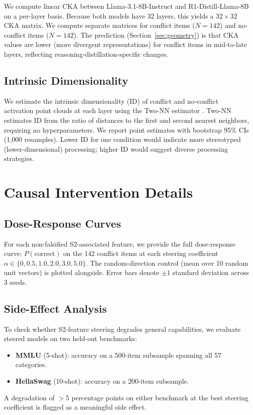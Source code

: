 We compute linear CKA \citep{kornblith2019similarity} between
Llama-3.1-8B-Instruct and R1-Distill-Llama-8B on a per-layer basis.
Because both models have 32 layers, this yields a $32 \times 32$ CKA
matrix.  We compute separate matrices for conflict items ($N = 142$) and
no-conflict items ($N = 142$).  The prediction (Section~\ref{sec:geometry})
is that CKA values are lower (more divergent representations) for conflict
items in mid-to-late layers, reflecting reasoning-distillation-specific
changes.

\subsection{Intrinsic Dimensionality}

We estimate the intrinsic dimensionality (ID) of conflict and no-conflict
activation point clouds at each layer using the Two-NN estimator
\citep{facco2017estimating}.  Two-NN estimates ID from the ratio of
distances to the first and second nearest neighbors, requiring no
hyperparameters.  We report point estimates with bootstrap 95\% CIs (1{,}000
resamples).  Lower ID for one condition would indicate more stereotyped
(lower-dimensional) processing; higher ID would suggest diverse processing
strategies.

\section{Causal Intervention Details}
\label{app:causal}

\subsection{Dose-Response Curves}

For each non-falsified S2-associated feature, we provide the full
dose-response curve: $P(\text{correct})$ on the 142 conflict items at
each steering coefficient $\alpha \in \{0, 0.5, 1.0, 2.0, 3.0, 5.0\}$.
The random-direction control (mean over 10 random unit vectors) is plotted
alongside.  Error bars denote $\pm 1$ standard deviation across 3 seeds.

\subsection{Side-Effect Analysis}

To check whether S2-feature steering degrades general capabilities, we
evaluate steered models on two held-out benchmarks:
\begin{itemize}[leftmargin=*,itemsep=1pt]
  \item \textbf{MMLU} (5-shot): accuracy on a 500-item subsample spanning
  all 57 categories.
  \item \textbf{HellaSwag} (10-shot): accuracy on a 200-item subsample.
\end{itemize}
A degradation of $>$5 percentage points on either benchmark at the best
steering coefficient is flagged as a meaningful side effect.

